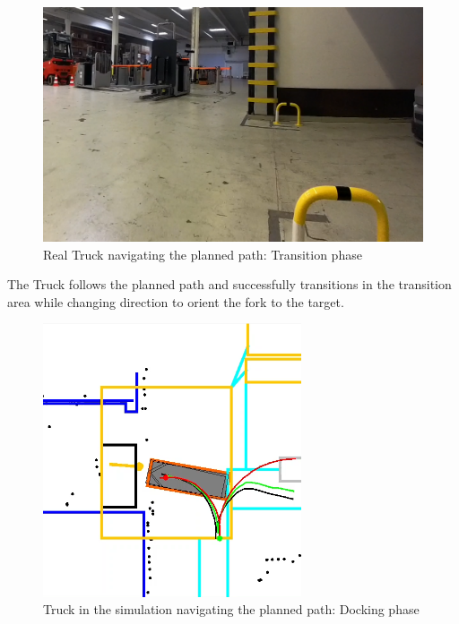 \begin{figure}[H]
    \begin{center}
        \includegraphics[width=5in]{images/Chap3/Test1_real_transition.png} %
        \caption{Real Truck navigating the planned path: Transition phase}
        \label{OptResult11}
        \end{center}    
\end{figure}

The Truck follows the planned path and successfully 
transitions in the transition area while changing direction to orient the 
fork to the target.

\begin{figure}[H]
    \begin{center}
        \includegraphics[width=3in]{images/Chap3/Test1_dock.png} %
        \caption{Truck in the simulation navigating the planned path: Docking phase}
        \label{OptResult10}
        \end{center}    
\end{figure}


